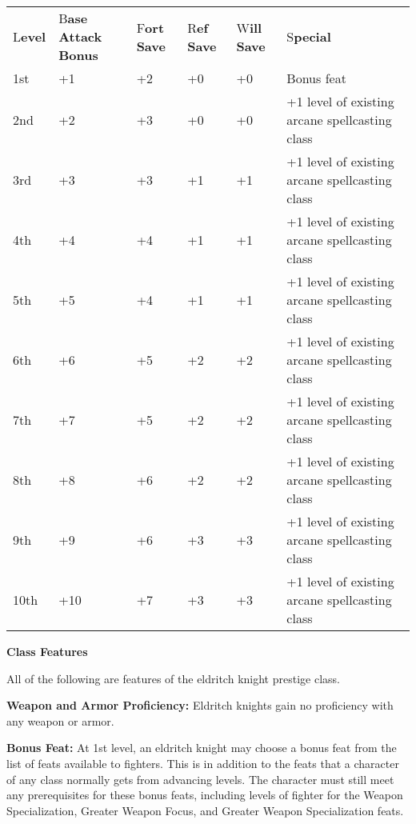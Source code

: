 \documentclass{article}
\begin{document}
\vspace{12pt}
\parindent=0pt
\begin{tabular}{|>{\raggedright}p{24pt}|>{\raggedright}p{29pt}|>{\raggedright}p{20pt}|>{\raggedright}p{20pt}|>{\raggedright}p{20pt}|>{\raggedright}p{161pt}|}
\hline
\multicolumn{6}{|p{278pt}|}{T\textbf{able: The Eldritch Knight}}\tabularnewline
\hline
L\textbf{evel} & B\textbf{ase}\linebreak{}
\textbf{Attack}\linebreak{}
\textbf{Bonus} & F\textbf{ort}\linebreak{}
\textbf{Save} & R\textbf{ef}\linebreak{}
\textbf{Save} & W\textbf{ill}\linebreak{}
\textbf{Save} & S\textbf{pecial}\tabularnewline
\hline
1st & +1 & +2 & +0 & +0 & Bonus feat\tabularnewline
\hline
2nd & +2 & +3 & +0 & +0 & +1 level of existing arcane spellcasting class\tabularnewline
\hline
3rd & +3 & +3 & +1 & +1 & +1 level of existing arcane spellcasting class\tabularnewline
\hline
4th & +4 & +4 & +1 & +1 & +1 level of existing arcane spellcasting class\tabularnewline
\hline
5th & +5 & +4 & +1 & +1 & +1 level of existing arcane spellcasting class\tabularnewline
\hline
6th & +6 & +5 & +2 & +2 & +1 level of existing arcane spellcasting class\tabularnewline
\hline
7th & +7 & +5 & +2 & +2 & +1 level of existing arcane spellcasting class\tabularnewline
\hline
8th & +8 & +6 & +2 & +2 & +1 level of existing arcane spellcasting class\tabularnewline
\hline
9th & +9 & +6 & +3 & +3 & +1 level of existing arcane spellcasting class\tabularnewline
\hline
10th & +10 & +7 & +3 & +3 & +1 level of existing arcane spellcasting class\tabularnewline
\hline
\end{tabular}

\vspace{12pt}
\textbf{Class Features}

All of the following are features of the eldritch knight prestige class.

\textbf{Weapon and Armor Proficiency:} Eldritch knights gain no proficiency with 
any weapon or armor.

\textbf{Bonus Feat:} At 1st level, an eldritch knight may choose a bonus feat from 
the list of feats available to fighters. This is in addition to the feats that 
a character of any class normally gets from advancing levels. The character must 
still meet any prerequisites for these bonus feats, including levels of fighter 
for the Weapon Specialization, Greater Weapon Focus, and Greater Weapon Specialization 
feats.
\end{document}
